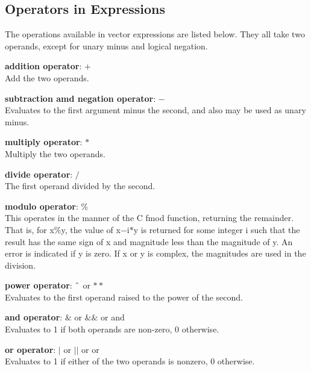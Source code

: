 \subsection{Operators in Expressions}


The operations available in vector expressions are listed below.  They
all take two operands, except for unary minus and logical negation. 

\begin{description}
\item{{\bf addition operator}: {\vt $+$}}\\
Add the two operands.

\item{{\bf subtraction amd negation operator}: {\vt $-$}}\\
Evaluates to the first argument minus the second, and also may be used
as unary minus.

\item{{\bf multiply operator}: {\vt $*$}}\\
Multiply the two operands.

\item{{\bf divide operator}: {\vt $/$}}\\
The first operand divided by the second.

\item{{\bf modulo operator}: {\vt $\%$}}\\
This operates in the manner of the C {\vt fmod} function, returning
the remainder.  That is, for {\vt x$\%$y}, the value of {\vt
x$-$i$*$y} is returned for some integer {\vt i} such that the result
has the same sign of {\vt x} and magnitude less than the magnitude of
{\vt y}.  An error is indicated if {\vt y} is zero.  If {\vt x} or
{\vt y} is complex, the magnitudes are used in the division.

\item{{\bf power operator}: {\vt $\symbol{94}$} or {\vt $**$}}\\
Evaluates to the first operand raised to the power of the second.

\item{{\bf and operator}: {\vt $\&$} or {\vt $\&\&$} or {\vt and}}\\
Evaluates to 1 if both operands are non-zero, 0 otherwise.

\item{{\bf or operator}: {\vt $|$} or {\vt $||$} or {\vt or}}\\
Evaluates to 1 if either of the two operands is nonzero, 0 otherwise.


\end{description}
